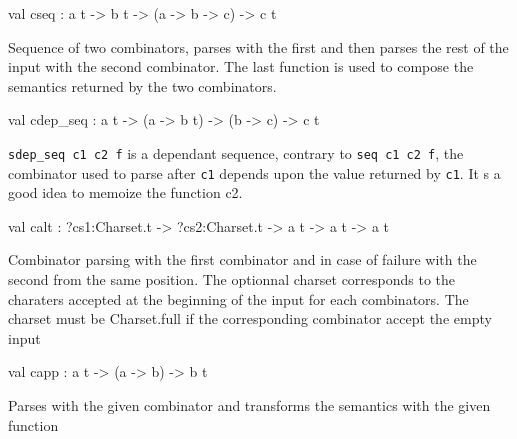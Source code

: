 \documentclass[11pt]{article}
\begin{document}
\label{val:Combinator.cseq}\begin{ocamldoccode}
val cseq : {\textquotesingle}a t -> {\textquotesingle}b t -> ({\textquotesingle}a -> {\textquotesingle}b -> {\textquotesingle}c) -> {\textquotesingle}c t
\end{ocamldoccode}
\begin{ocamldocdescription}
Sequence of two combinators, parses with the first and then parses the
    rest of the input with the second combinator. The last function
    is used to compose the semantics returned by the two combinators.


\end{ocamldocdescription}




\label{val:Combinator.cdep-underscoreseq}\begin{ocamldoccode}
val cdep_seq : {\textquotesingle}a t -> ({\textquotesingle}a -> {\textquotesingle}b t) -> ({\textquotesingle}b -> {\textquotesingle}c) -> {\textquotesingle}c t
\end{ocamldoccode}
\begin{ocamldocdescription}
{\tt{sdep\_seq c1 c2 f}} is a dependant sequence, contrary to {\tt{seq c1 c2 f}},
    the combinator used to parse after {\tt{c1}} depends upon the value
    returned by {\tt{c1}}. It s a good idea to memoize the function c2.


\end{ocamldocdescription}




\label{val:Combinator.calt}\begin{ocamldoccode}
val calt : ?cs1:Charset.t ->
  ?cs2:Charset.t -> {\textquotesingle}a t -> {\textquotesingle}a t -> {\textquotesingle}a t
\end{ocamldoccode}
\begin{ocamldocdescription}
Combinator parsing with the first combinator and in case
    of failure with the second from the same position.
    The optionnal charset corresponds to the charaters accepted
    at the beginning of the input for each combinators.
    The charset must be Charset.full if the corresponding combinator
    accept the empty input


\end{ocamldocdescription}




\label{val:Combinator.capp}\begin{ocamldoccode}
val capp : {\textquotesingle}a t -> ({\textquotesingle}a -> {\textquotesingle}b) -> {\textquotesingle}b t
\end{ocamldoccode}
\begin{ocamldocdescription}
Parses with the given combinator and transforms the semantics with
    the given function


\end{ocamldocdescription}
\end{document}
